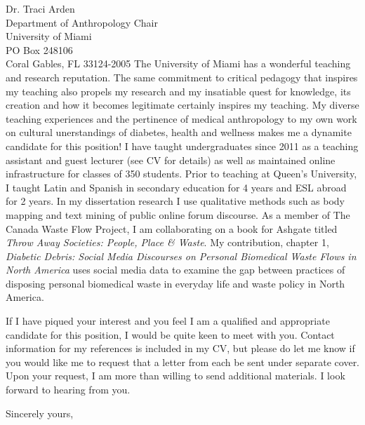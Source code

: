 \documentclass[10pt]{letter} %
\begin{document}
\begin{letter}{Dr. Traci Arden \\
Department of Anthropology Chair \\
University of Miami \\
PO Box 248106 \\
Coral Gables, FL 33124-2005}
The University of Miami has a wonderful teaching and research reputation. The same commitment to critical pedagogy that inspires my teaching also propels my research and my insatiable quest for knowledge, its creation and how it becomes legitimate certainly inspires my teaching. My diverse teaching experiences and the pertinence of medical anthropology to my own work on cultural unerstandings of diabetes, health and wellness makes me a dynamite candidate for this position! I have taught undergraduates since 2011 as a teaching assistant and guest lecturer (see CV for details) as well as maintained online infrastructure for classes of 350 students. Prior to teaching at Queen's University, I taught Latin and Spanish in secondary education for 4 years and ESL abroad for 2 years. 
In my dissertation research I use qualitative methods such as body mapping and text mining of public online forum discourse. As a member of The Canada Waste Flow Project, I am collaborating on a book for Ashgate titled \textit{Throw Away Societies: People, Place \& Waste}. My contribution, chapter 1, \textit{Diabetic Debris: Social Media Discourses on Personal Biomedical Waste Flows in North America} uses social media data to examine the gap between practices of disposing personal biomedical waste in everyday life and waste policy in North America. 
 
If I have piqued your interest and you feel I am a qualified and appropriate candidate for this position, I would be quite keen to meet with you. Contact information for my references is included in my CV, but please do let me know if you would like me to request that a letter from each be sent under separate cover. Upon your request, I am more than willing to send additional materials. I look forward to hearing from you.

\closing{Sincerely yours,}




\end{letter}
\end{document}
